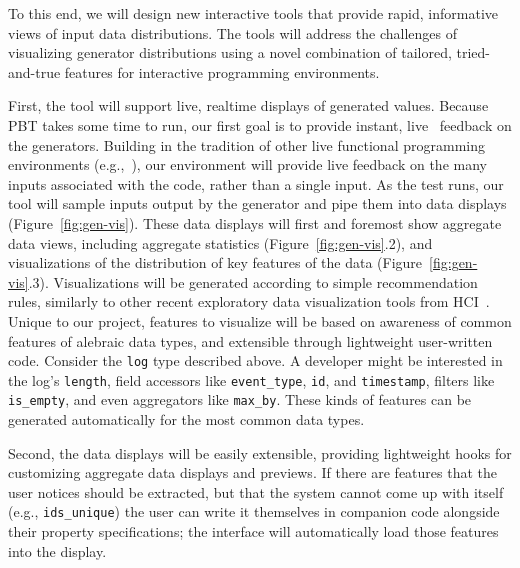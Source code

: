 To this end, we will design new interactive tools that provide rapid,
informative views of input data distributions. The tools will address the
challenges of visualizing generator distributions using a novel combination of
tailored, tried-and-true features for interactive programming environments.

First, the tool will support live, realtime displays of generated values.
Because PBT takes some time to run, our first goal is to provide
instant, live~\cite{ref:tanimoto1990viva} feedback on the generators. Building
in the tradition of other live functional programming environments
(e.g.,~\cite{tool:lighttable,ref:omar2019live}), our environment will provide
live feedback on the many inputs associated with the code, rather than a single
input. As the test runs, our tool will sample inputs output by the generator and
pipe them into data displays (Figure~\ref{fig:gen-vis}). These data displays
will first and foremost show aggregate data views, including aggregate
statistics (Figure~\ref{fig:gen-vis}.2), and visualizations of the distribution
of key features of the data (Figure~\ref{fig:gen-vis}.3). Visualizations will be
generated according to simple recommendation rules, similarly to other recent
exploratory data visualization tools from
HCI~\cite{ref:lee2021lux,wongsuphasawat_voyager_2016,
wongsuphasawat_voyager_2017}. Unique to our project, features to visualize will
be based on awareness of common features of alebraic data types, and extensible
through lightweight user-written code. Consider the \lstinline{log} type
described above. A developer might be interested in the log's
\lstinline{length}, field accessors like \lstinline{event_type}, \lstinline{id},
and \lstinline{timestamp}, filters like \lstinline{is_empty}, and even
aggregators like \lstinline{max_by}. These kinds of features can be generated
automatically for the most common data types.

Second, the data displays will be easily extensible, providing lightweight hooks
for customizing aggregate data displays and previews. If
there are features that the user notices should be extracted, but that the
system cannot come up with itself (e.g., \lstinline{ids_unique}) the user can
write it themselves in companion code alongside their property specifications;
the interface will automatically load those features into the display.

